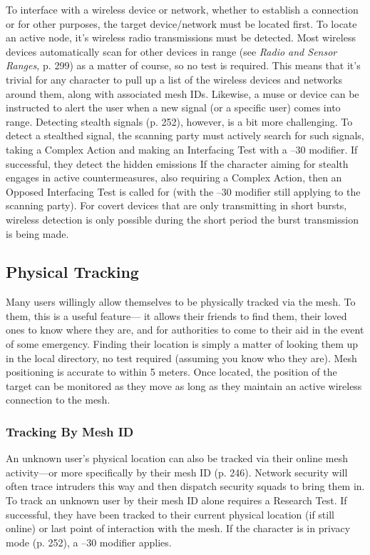 To interface with a wireless device or network, whether to establish a connection or for other purposes, the target device/network must be located first. To locate an active node, it's wireless radio transmissions must be detected. Most wireless devices automatically scan for other devices in range (see \textit{Radio and Sensor Ranges,} p. 299) as a matter of course, so no test is required. This means that it's trivial for any character to pull up a list of the wireless devices and networks around them, along with associated mesh IDs. Likewise, a muse or device can be instructed to alert the user when a new signal (or a specific user) comes into range. Detecting stealth signals (p. 252), however, is a bit more challenging. To detect a stealthed signal, the scanning party must actively search for such signals, taking a Complex Action and making an Interfacing Test with a –30 modifier. If successful, they detect the hidden emissions If the character aiming for stealth engages in active countermeasures, also requiring a Complex Action, then an Opposed Interfacing Test is called for (with the –30 modifier still applying to the scanning party). For covert devices that are only transmitting in short bursts, wireless detection is only possible during the short period the burst transmission is being made. 

\subsection{Physical Tracking} 

Many users willingly allow themselves to be physically tracked via the mesh. To them, this is a useful feature— it allows their friends to find them, their loved ones to know where they are, and for authorities to come to their aid in the event of some emergency. Finding their location is simply a matter of looking them up in the local directory, no test required (assuming you know who they are). Mesh positioning is accurate to within 5 meters. Once located, the position of the target can be monitored as they move as long as they maintain an active wireless connection to the mesh. 

\subsubsection{Tracking By Mesh ID} 

An unknown user's physical location can also be tracked via their online mesh activity—or more specifically by their mesh ID (p. 246). Network security will often trace intruders this way and then dispatch security squads to bring them in. To track an unknown user by their mesh ID alone requires a Research Test. If successful, they have been tracked to their current physical location (if still online) or last point of interaction with the mesh. If the character is in privacy mode (p. 252), a –30 modifier applies. 

